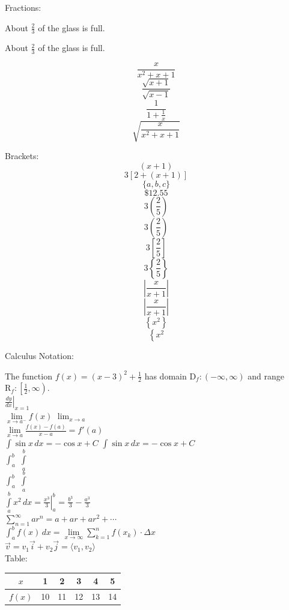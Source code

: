 \documentclass[11pt]{article}
\begin{document}
Fractions:

About ${\frac{2}{3}}$ of the glass is full.

About $\displaystyle{\frac{2}{3}}$ of the glass is full.

$$\frac{x}{x^2+x+1}$$
$$\frac{\sqrt{x+1}}{\sqrt{x-1}}$$
$$\frac{1}{1+\frac{1}{x}}$$
$$\sqrt{\frac{x}{x^2+x+1}}$$

Brackets:
$$(x+1)$$
$$3[2+(x+1)]$$
$$\{a,b,c\}$$
$$\$12.55$$
$$3(\frac{2}{5})$$
$$3\left(\frac{2}{5}\right)$$
$$3\left[\frac{2}{5}\right]$$
$$3\left\{\frac{2}{5}\right\}$$
$$|\frac{x}{x+1}|$$
$$\left| \frac{x}{x+1} \right|$$
$$\left\{x^2\right\}$$
$$\left\{x^2\right.$$

Calculus Notation:

The function $f(x)=(x-3)^2+\frac{1}{2}$ has domain $\mathrm{D}_f:(-\infty,\infty)$ and range $\mathrm{R}_f:\left[\frac{1}{2},\infty\right)$. \\

$\left. \frac{dy}{dx} \right|_{x=1}$ \\

$\lim \limits_{x \to a^-} f(x)$
$\lim_{x \to a}$ \\

$\displaystyle{\lim \limits_{x \to a} \frac{f(x)-f(a)}{x-a}=f'(a)}$ \\

$\int \sin x \,dx=-\cos x+C$
$\displaystyle{\int \sin x \,dx=-\cos x+C}$ \\

$\int_a^b$
$\int \limits_a^b$ \\

$\displaystyle{\int_a^b}$
$\displaystyle{\int \limits_a^b}$\\

$\displaystyle{\int \limits_{a}^{b} x^2 \,dx=\left.\frac{x^3}{3}\right|_a^b=\frac{b^3}{3}-\frac{a^3}{3}}$\\

$\displaystyle{\sum \limits_{n=1}^{\infty} ar^n = a+ar+ar^2+\cdots}$\\

$\displaystyle{\int_a^b f(x) \,dx=\lim \limits_{x \to \infty} \sum \limits_{k=1}^{n}f(x_k)\cdot \Delta x}$ \\

$\vec{v}=v_1 \vec{i}+v_2\vec{j}=\langle v_1,v_2\rangle$\\

Table:\\

\begin{tabular}{|c|c|c|c|c|c|}
\hline
$x$ & 1 & 2 & 3 & 4 & 5 \\ \hline
$f(x)$ & 10 & 11 & 12 & 13 & 14 \\ \hline
\end{tabular} \\
\end{document}
